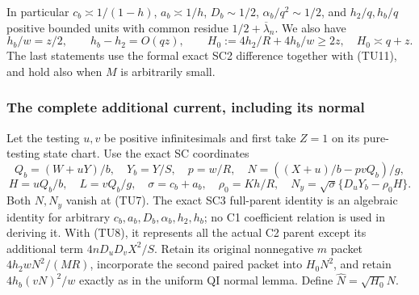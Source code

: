 In particular $c_b\asymp1/(1-h)$, $a_b\asymp1/h$,
$D_b\sim1/2$, $\alpha_b/q^2\sim1/2$, and
$h_2/q,h_b/q$ positive bounded units with common residue
$1/2+\overline\lambda_n$.  We also have
\[
 h_b/w=z/2,\qquad h_b-h_2=O(qz),\qquad
 H_0:=4h_2/R+4h_b/w\geq2z,
 \quad H_0\asymp q+z.                                  \tag{TU13}
\]
The last statements use the formal exact SC2 difference together
with (TU11), and hold also when $M$ is arbitrarily small.

\subsubsection*{The complete additional current, including its normal}

Let the testing $u,v$ be positive infinitesimals and first take
$Z=1$ on its pure-testing state chart.  Use the exact SC coordinates
\[
 Q_b=(W+uY)/b,\quad Y_b=Y/S,\quad p=w/R,\quad
 N=((X+u)/b-pvQ_b)/g,
\]
\[
 H=uQ_b/b,\quad L=vQ_b/g,\quad
 \sigma=c_b+a_b,\quad \rho_0=Kh/R,\quad
 N_y=\sqrt\sigma\{D_uY_b-\rho_0H\}.
                                                               \tag{TU14}
\]
Both $N,N_y$ vanish at (TU7).  The exact SC3 full-parent identity
is an algebraic identity for arbitrary $c_b,a_b,D_b,\alpha_b,h_2,h_b$;
no C1 coefficient relation is used in deriving it.  With (TU8),
it represents all the actual C2 parent except its additional term
$4nD_uD_vX^2/S$.  Retain its original nonnegative $m$ packet
$4h_2wN^2/(MR)$, incorporate the second paired packet into
$H_0N^2$, and retain $4h_b(vN)^2/w$ exactly as in the uniform
QI normal lemma.  Define $\widehat N=\sqrt{H_0}N$.

